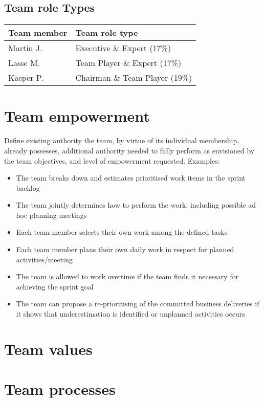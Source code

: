 \documentclass{article}
\begin{document}
\subsection{Team role Types}

\begin{tabel}
    \centering
    \begin{tabular}{l|l}
        \rowcolor{Gray}
        \textbf{Team member} & \textbf{Team role type}\\\hline
        Martin J.            & Executive \& Expert (17\%) \\
        Lasse M.             & Team Player \& Expert (17\%) \\
        Kasper P.            & Chairman \& Team Player (19\%)
    \end{tabular}
    \label{tab:roleTypes}
\end{tabel}

\section{Team empowerment}
Define existing authority the team, by virtue of its individual membership, already possesses, additional
authority needed to fully perform as envisioned by the team objectives, and level of empowerment requested.
Examples:
\begin{itemize}
    \item The team breaks down and estimates prioritised work items in the sprint backlog
    \item The team jointly determines how to perform the work, including possible ad hoc planning meetings
    \item Each team member selects their own work among the defined tasks
    \item Each team member plans their own daily work in respect for planned activities/meeting
    \item The team is allowed to work overtime if the team finds it necessary for achieving the sprint goal
    \item The team can propose a re-prioritising of the committed business deliveries if it shows that underestimation is identified or unplanned activities occurs
\end{itemize}

\section{Team values}

\section{Team processes}
\end{document}
